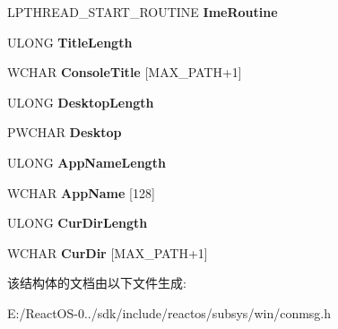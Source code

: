 \begin{DoxyCompactItemize}
\item 
\mbox{\label{struct___c_o_n_s_r_v___a_p_i___c_o_n_n_e_c_t_i_n_f_o_a867ed35749bfa53d238ebf4b0af2c5d8}} 
L\+P\+T\+H\+R\+E\+A\+D\+\_\+\+S\+T\+A\+R\+T\+\_\+\+R\+O\+U\+T\+I\+NE {\bfseries Ime\+Routine}
\item 
\mbox{\label{struct___c_o_n_s_r_v___a_p_i___c_o_n_n_e_c_t_i_n_f_o_a12e5e2a1b9a13e1184320fa3b5955be5}} 
U\+L\+O\+NG {\bfseries Title\+Length}
\item 
\mbox{\label{struct___c_o_n_s_r_v___a_p_i___c_o_n_n_e_c_t_i_n_f_o_a4da6c0dad5556f9ff97adc860e719a42}} 
W\+C\+H\+AR {\bfseries Console\+Title} \mbox{[}M\+A\+X\+\_\+\+P\+A\+TH+1\mbox{]}
\item 
\mbox{\label{struct___c_o_n_s_r_v___a_p_i___c_o_n_n_e_c_t_i_n_f_o_a5ca2194f2c953234108f95db8239d861}} 
U\+L\+O\+NG {\bfseries Desktop\+Length}
\item 
\mbox{\label{struct___c_o_n_s_r_v___a_p_i___c_o_n_n_e_c_t_i_n_f_o_ab6f31a90eea49a8166e69395d0a239c1}} 
P\+W\+C\+H\+AR {\bfseries Desktop}
\item 
\mbox{\label{struct___c_o_n_s_r_v___a_p_i___c_o_n_n_e_c_t_i_n_f_o_aed7aa4691001ae69dcafec3da592e91e}} 
U\+L\+O\+NG {\bfseries App\+Name\+Length}
\item 
\mbox{\label{struct___c_o_n_s_r_v___a_p_i___c_o_n_n_e_c_t_i_n_f_o_ab67593cc4c0104bdf5445089d2c6ab9b}} 
W\+C\+H\+AR {\bfseries App\+Name} \mbox{[}128\mbox{]}
\item 
\mbox{\label{struct___c_o_n_s_r_v___a_p_i___c_o_n_n_e_c_t_i_n_f_o_a3e5924c4d68942753fec784776e4be64}} 
U\+L\+O\+NG {\bfseries Cur\+Dir\+Length}
\item 
\mbox{\label{struct___c_o_n_s_r_v___a_p_i___c_o_n_n_e_c_t_i_n_f_o_abe9720e7b04c239f5557cfa1456bd72f}} 
W\+C\+H\+AR {\bfseries Cur\+Dir} \mbox{[}M\+A\+X\+\_\+\+P\+A\+TH+1\mbox{]}
\end{DoxyCompactItemize}


该结构体的文档由以下文件生成\+:\begin{DoxyCompactItemize}
\item 
E\+:/\+React\+O\+S-\/0../sdk/include/reactos/subsys/win/conmsg.\+h\end{DoxyCompactItemize}
